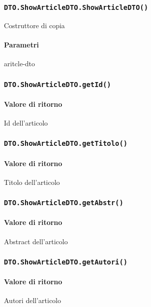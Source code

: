 \subsubsection{\texttt{DTO.ShowArticleDTO.ShowArticleDTO()}}
Costruttore di copia
\paragraph{Parametri}
\begin{description}
\item aritcle-dto
\end{description}
\subsubsection{\texttt{DTO.ShowArticleDTO.getId()}}
\paragraph{Valore di ritorno}
\begin{description}
\item Id dell'articolo 
\end{description}
\subsubsection{\texttt{DTO.ShowArticleDTO.getTitolo()}}
\paragraph{Valore di ritorno}
\begin{description}
\item Titolo dell'articolo
\end{description}
\subsubsection{\texttt{DTO.ShowArticleDTO.getAbstr()}}
\paragraph{Valore di ritorno}
\begin{description}
\item Abstract dell'articolo
\end{description}
\subsubsection{\texttt{DTO.ShowArticleDTO.getAutori()}}
\paragraph{Valore di ritorno}
\begin{description}
\item Autori dell'articolo
\end{description}



